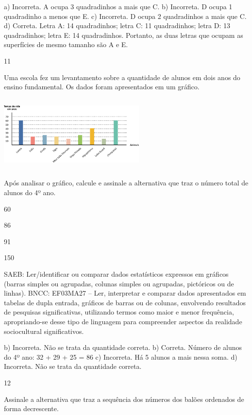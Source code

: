 \begin{multicols}{2}
\begin{enumerate}
{a) Incorreta. A ocupa 3 quadradinhos a mais que C.
b) Incorreta. D ocupa 1 quadradinho a menos que E.
c) Incorreta. D ocupa 2 quadradinhos a mais que C.
d) Correta. Letra A: 14 quadradinhos; letra C: 11 quadradinhos; letra D: 13 quadradinhos; letra E: 14 quadradinhos. Portanto, as duas letras que ocupam as superfícies de mesmo tamanho são A e E.

\num{11}

Uma escola fez um levantamento sobre a quantidade de alunos em dois anos
do ensino fundamental. Os dados foram apresentados em um gráfico.


\includegraphics[width=2.89744in,height=1.52156in]{media/image112.png}

Após analisar o gráfico, calcule e assinale a alternativa que traz o número total de alunos do 4º ano.

\begin{escolha}
\item
  60
\item
  86
\item
  91
\item
  150
\end{escolha}

SAEB: Ler/identificar ou comparar dados estatísticos
expressos em gráficos (barras simples ou agrupadas, colunas simples ou
agrupadas, pictóricos ou de linhas).
BNCC: EF03MA27 -- Ler, interpretar e comparar dados apresentados em tabelas de dupla entrada,
gráficos de barras ou de colunas, envolvendo resultados de pesquisas significativas, utilizando
termos como maior e menor frequência, apropriando-se desse tipo de linguagem para
compreender aspectos da realidade sociocultural significativos.

b) Incorreta. Não se trata da quantidade correta.
b) Correta. Número de alunos do 4º ano: 32 + 29 + 25 = 86 
c) Incorreta. Há 5 alunos a mais nessa soma.
d) Incorreta. Não se trata da quantidade correta.

\num{12}

Assinale a alternativa que traz a sequência dos números dos balões ordenados de forma decrescente.

}
\end{enumerate}
\end{multicols}
